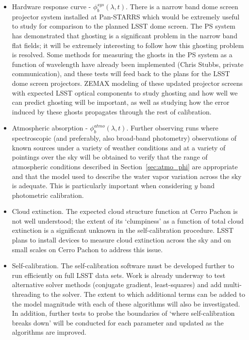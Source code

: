 \documentclass[12pt,preprint]{aastex}
\begin{document}
\begin{itemize}

\item{Hardware response curve - $\phi_b^{sys}(\lambda,t)$. There is a
    narrow band dome screen projector system installed at Pan-STARRS
    which would be extremely useful to study for comparison to the
    planned LSST dome screen. The PS system has demonstrated that
    ghosting is a significant problem in the narrow band flat fields;
    it will be extremely interesting to follow how this ghosting
    problem is resolved. Some methods for measuring the ghosts in the
    PS system as a function of wavelength have already been
    implemented (Chris Stubbs, private communication), and these tests
    will feed back to the plans for the LSST dome screen
    projectors. ZEMAX modeling of these updated projector screens
    with expected LSST optical components to study ghosting and how
    well we can predict ghosting will be important, as well as
    studying how the error induced by these ghosts propagates through
    the rest of calibration. }

\item{Atmospheric absorption - $\phi_b^{atmo}(\lambda,t)$. Further
    observing runs where spectroscopic (and preferably, also
    broad-band photometry) observations of known sources under a
    variety of weather conditions and at a variety of pointings over
    the sky will be obtained to verify that the range of atmospheric
    conditions described in Section~\ref{sec:atmo_phi} are appropriate
    and that the model used to describe the water vapor variation
    across the sky is adequate. This is particularly important when
    considering $y$ band photometric calibration. }

\item{Cloud extinction. The expected cloud structure function at Cerro
    Pachon is not well understood; the extent of its `clumpiness' as a
    function of total cloud extinction is a significant unknown in the
    self-calibration procedure. LSST plans to install 
    devices to measure cloud extinction across the sky and on small
    scales on Cerro Pachon to address this issue. }

\item{Self-calibration. The self-calibration software must be
    developed further to run efficiently on full LSST data sets. Work
    is already underway to test alternative solver methods (conjugate
    gradient, least-squares) and add multi-threading to the
    solver. The extent to which additional terms can be added to the
    model magnitude with each of these algorithms will also be
    investigated. In addition, further tests to probe the boundaries
    of `where self-calibration breaks down' will be conducted for each
  parameter and updated as the algorithms are improved.}


\end{itemize}
\end{document}
